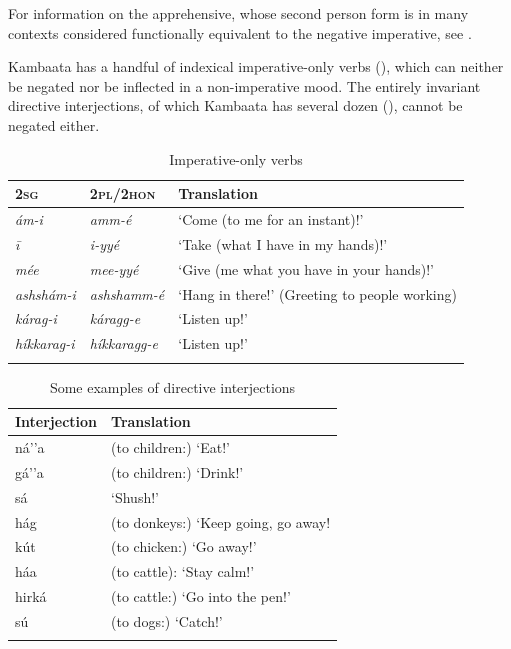 \documentclass[output=paper,colorlinks,citecolor=brown,draftmode
]{langscibook}
\begin{document}
For information on the apprehensive, whose second person form is in many contexts considered functionally equivalent to the negative imperative, see .

Kambaata has a handful of indexical imperative-only verbs (), which can neither be negated nor be inflected in a non-imperative mood. The entirely invariant directive interjections, of which Kambaata has several dozen (), cannot be negated either.


\begin{table}
\caption{Imperative-only verbs}
\label{tab:treis:5}
 \begin{tabularx}{\textwidth}{Xll}
    \lsptoprule
    \textsc{2sg} & \textsc{2pl/2hon} & Translation\\
    \midrule
    \textit{ám-i} & \textit{amm-é} & ‘Come (to me for an instant)!’\\
    \textit{ī} & \textit{i-yyé} & ‘Take (what I have in my hands)!’\\
    \textit{mée} & \textit{mee-yyé} & ‘Give (me what you have in your hands)!’\\
    \textit{ashshám-i} & \textit{ashshamm-é} & ‘Hang in there!’ (Greeting to people working)\\
    \textit{kárag-i} & \textit{káragg-e} & ‘Listen up!’\\
    \textit{híkkarag-i} & \textit{híkkaragg-e} & ‘Listen up!’\\
    \lspbottomrule
 \end{tabularx}
\end{table}

\begin{table}
\caption{Some examples of directive interjections}
\label{tab:treis:6}
 \begin{tabular}{ll}
    \lsptoprule
    Interjection & Translation\\
    \midrule
    ná’’a & (to children:) ‘Eat!’\\
    gá’’a  & (to children:) ‘Drink!’\\
    sá & ‘Shush!’\\
    hág & (to donkeys:) ‘Keep going, go away!\\
    kút & (to chicken:) ‘Go away!’\\
    háa & (to cattle): ‘Stay calm!’\\
    hirká & (to cattle:) ‘Go into the pen!’\\
    sú & (to dogs:) ‘Catch!’\\
    \lspbottomrule
 \end{tabular}
\end{table}
\end{document}
